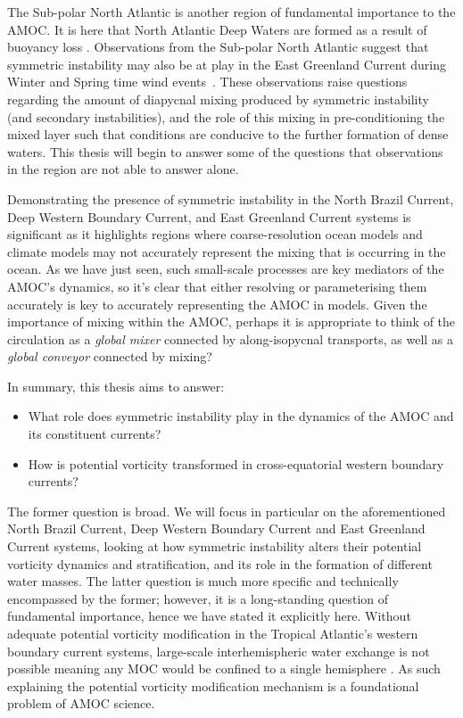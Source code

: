
The Sub-polar North Atlantic is another region of fundamental importance to the AMOC. It is here that North Atlantic Deep Waters are formed as a result of buoyancy loss \citep[e.g.]{Marshall1999, Pickart2003, DeJong2016, Lozier2019}. Observations from the Sub-polar North Atlantic suggest that symmetric instability may also be at play in the East Greenland Current during Winter and Spring time wind events~\citep{LeBras2022}. These observations raise questions regarding the amount of diapycnal mixing produced by symmetric instability (and secondary instabilities), and the role of this mixing in pre-conditioning the mixed layer such that conditions are conducive to the further formation of dense waters. This thesis will begin to answer some of the questions that observations in the region are not able to answer alone.

Demonstrating the presence of symmetric instability in the North Brazil Current, Deep Western Boundary Current, and East Greenland Current systems is significant as it highlights regions where coarse-resolution ocean models and climate models may not accurately represent the mixing that is occurring in the ocean. As we have just seen, such small-scale processes are key mediators of the AMOC's dynamics, so it's clear that either resolving or parameterising them accurately is key to accurately representing the AMOC in models. Given the importance of mixing within the AMOC, perhaps it is appropriate to think of the circulation as a \textit{global mixer} connected by along-isopycnal transports, as well as a \textit{global conveyor} connected by mixing?

In summary, this thesis aims to answer:
\begin{itemize}
    \item What role does symmetric instability play in the dynamics of the AMOC and its constituent currents?
    \item How is potential vorticity transformed in cross-equatorial western boundary currents?
\end{itemize}
The former question is broad. We will focus in particular on the aforementioned North Brazil Current, Deep Western Boundary Current and East Greenland Current systems, looking at how symmetric instability alters their potential vorticity dynamics and stratification, and its role in the formation of different water masses. The latter question is much more specific and technically encompassed by the former; however, it is a long-standing question of fundamental importance, hence we have stated it explicitly here. Without adequate potential vorticity modification in the Tropical Atlantic's western boundary current systems, large-scale interhemispheric water exchange is not possible meaning any MOC would be confined to a single hemisphere \citep{Killworth1991, Nof1990, Csanady1985, Johnson1993}. As such explaining the potential vorticity modification mechanism is a foundational problem of AMOC science.

